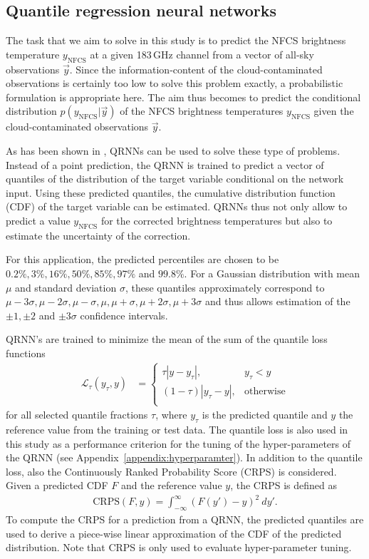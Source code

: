 \documentclass[amt, manuscript]{copernicus}
\newcommand{\ynfcs}{y_\text{NFCS}}
\newcommand{\y}{\vec{y}}
\begin{document}
\subsection{Quantile regression neural networks}
\label{sec:QRNN}
%
The task that we aim to solve in this study is to predict the NFCS brightness
temperature $\ynfcs$ at a given 183\,GHz channel from a vector of
all-sky observations $\y$. Since the information-content of the
cloud-contaminated observations is certainly too low to solve this problem
exactly, a probabilistic formulation is appropriate here. The aim thus becomes
to predict the conditional distribution $p(\ynfcs | \y)$ of the NFCS brightness
temperatures $\ynfcs$ given the cloud-contaminated observations $\y$.

As has been shown in \citet{pfreundschuh:aneur:18}, QRNNs can be used to solve
these type of problems. Instead of a point prediction, the QRNN is trained to
predict a vector of quantiles of the distribution of the target variable
conditional on the network input. Using these predicted quantiles, the cumulative
distribution function (CDF) of the target variable can be estimated. QRNNs thus
not only allow to predict a value $\ynfcs$ for the corrected brightness temperatures
but also to estimate the uncertainty of the correction.

For this application, the predicted percentiles are chosen to be
$0.2\%, 3\%, 16\%, 50\%, 85\%, 97\%$ and $99.8\%$. For a Gaussian
distribution with mean $\mu$ and standard deviation $\sigma$, these quantiles
approximately correspond to $\mu -3\sigma, \mu-2\sigma, \mu-\sigma
, \mu, \mu + \sigma, \mu + 2\sigma, \mu + 3\sigma$ and thus allows
estimation of the $\pm 1, \pm 2$ and $\pm 3\sigma$ confidence intervals.

QRNN's are trained to minimize the mean of the sum of the quantile loss functions
%
\begin{align}
\mathcal{L}_\tau(y_\tau, y) &=
\begin{cases}
\tau|y - y_\tau|, & y_\tau < y \\ (1 - \tau)|y_\tau - y|, & \text{otherwise}
\\
\end{cases}
\end{align}
%
for all selected quantile fractions $\tau$, where $y_\tau$ is the predicted
quantile and $y$ the reference value from the training or test data. The
quantile loss is also used in this study as a performance criterion for the tuning of
the hyper-parameters of the QRNN (see Appendix~\ref{appendix:hyperparamter}). In
addition to the quantile loss, also the Continuously Ranked Probability Score
(CRPS) is considered. Given a predicted CDF
$F$ and the reference value $y$, the CRPS is defined as
%
\begin{align}
\text{CRPS}(F, y) = \int_{-\infty}^{\infty} \left (F(y') - y\right )^2\: dy'.
\end{align}
%
To compute the CRPS for a prediction from a QRNN, the predicted quantiles are
used to derive a piece-wise linear approximation of the CDF of the predicted
distribution. Note that CRPS is only used to evaluate hyper-parameter tuning.
\end{document}
